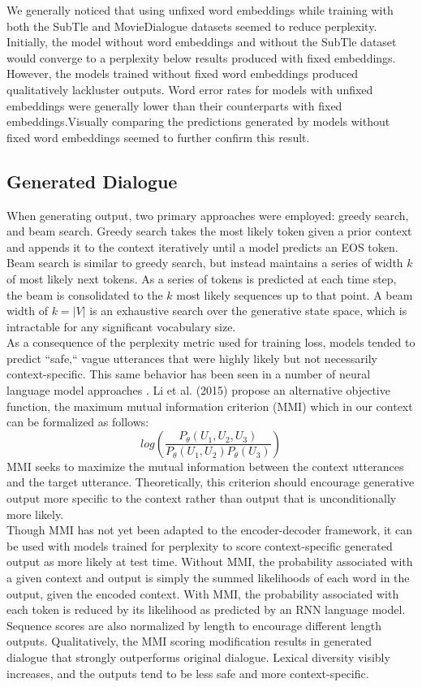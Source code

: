 \documentclass[11pt]{article}
\begin{document}
We generally noticed that using unfixed word embeddings while training with both the SubTle and MovieDialogue datasets seemed to reduce perplexity. Initially, the model without word embeddings and without the SubTle dataset would converge to a perplexity below results produced with fixed embeddings. However, the models trained without fixed word embeddings produced qualitatively lackluster outputs. Word error rates for models with unfixed embeddings were generally lower than their counterparts with fixed embeddings.Visually comparing the predictions generated by models without fixed word embeddings seemed to further confirm this result.

\subsection{Generated Dialogue}

When generating output, two primary approaches were employed: greedy search, and beam search. Greedy search takes the most likely token given a prior context and appends it to the context iteratively until a model predicts an EOS token. Beam search is similar to greedy search, but instead maintains a series of width $k$ of most likely next tokens. As a series of tokens is predicted at each time step, the beam is consolidated to the $k$ most likely sequences up to that point. A beam width of $k=|V|$ is an exhaustive search over the generative state space, which is intractable for any significant vocabulary size.\\

\noindent As a consequence of the perplexity metric used for training loss, models tended to predict ``safe,`` vague utterances that were highly likely but not necessarily context-specific. This same behavior has been seen in a number of neural language model approaches \cite{vinyals, serban, luan}. Li et al. (2015) \cite{li} propose an alternative objective function, the maximum mutual information criterion (MMI) which in our context can be formalized as follows: $$log(\frac{P_\theta(U_1,U_2,U_3)}{P_\theta(U_1,U_2)P_\theta(U_3)})$$
MMI seeks to maximize the mutual information between the context utterances and the target utterance. Theoretically, this criterion should encourage generative output more specific to the context rather than output that is unconditionally more likely. \\

\noindent Though MMI has not yet been adapted to the encoder-decoder framework, it can be used with models trained for perplexity to score context-specific generated output as more likely at test time. Without MMI, the probability associated with a given context and output is simply the summed likelihoods of each word in the output, given the encoded context. With MMI, the probability associated with each token is reduced by its likelihood as predicted by an RNN language model. Sequence scores are also normalized by length to encourage different length outputs. Qualitatively, the MMI scoring modification results in generated dialogue that strongly outperforms original dialogue. Lexical diversity visibly increases, and the outputs tend to be less safe and more context-specific.
\end{document}
